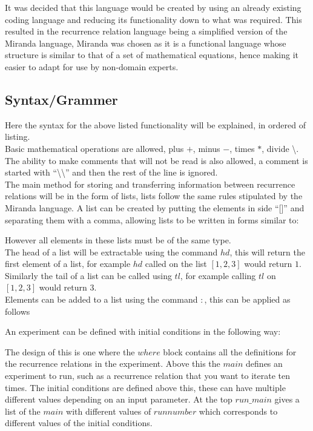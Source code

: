 \documentclass{article}
\begin{document}
It was decided that this language would be created by using an already existing coding language and reducing its functionality down to what was required. This resulted in the recurrence relation language being a simplified version of the Miranda language, Miranda was chosen as it is a functional language whose structure is similar to that of a set of mathematical equations, hence making it easier to adapt for use by non-domain experts.   

\subsection{Syntax/Grammer}
Here the syntax for the above listed functionality will be explained, in ordered of listing.\\
Basic mathematical operations are allowed, plus $+$, minus $-$, times $*$, divide \textbackslash. The ability to make comments that will not be read is also allowed, a comment is started with ``\textbackslash\textbackslash'' and then the rest of the line is ignored.\\ 
The main method for storing and transferring information between recurrence relations will be in the form of lists, lists follow the same rules stipulated by the Miranda language. A list can be created by putting the elements in side ``[]'' and separating them with a comma, allowing lists to be written in forms similar to:

However all elements in these lists must be of the same type.\\
The head of a list will be extractable using the command $hd$, this will return the first element of a list, for example $hd$ called on the list $[1,2,3]$ would return $1$. Similarly the tail of a list can be called using $tl$, for example calling $tl$ on $[1,2,3]$ would return $3$.\\  
Elements can be added to a list using the command $:$, this can be applied as follows  











An experiment can be defined with initial conditions in the following way:

The design of this is one where the $where$ block contains all the definitions for the recurrence relations in the experiment. Above this the $main$ defines an experiment to run, such as a recurrence relation that you want to iterate ten times. The initial conditions are defined above this, these can have multiple different values depending on an input parameter. At the top $run\_main$ gives a list of the $main$ with different values of $runnumber$ which corresponds to different values of the initial conditions.\\
 
\end{document}
